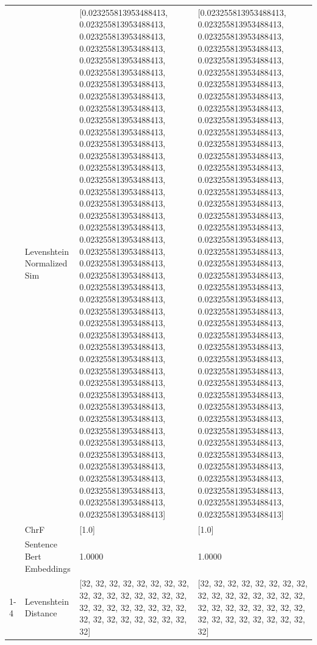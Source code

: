 \begin{tabular}{llll}
 & Levenshtein Normalized Sim & [0.023255813953488413, 0.023255813953488413, 0.023255813953488413, 0.023255813953488413, 0.023255813953488413, 0.023255813953488413, 0.023255813953488413, 0.023255813953488413, 0.023255813953488413, 0.023255813953488413, 0.023255813953488413, 0.023255813953488413, 0.023255813953488413, 0.023255813953488413, 0.023255813953488413, 0.023255813953488413, 0.023255813953488413, 0.023255813953488413, 0.023255813953488413, 0.023255813953488413, 0.023255813953488413, 0.023255813953488413, 0.023255813953488413, 0.023255813953488413, 0.023255813953488413, 0.023255813953488413, 0.023255813953488413, 0.023255813953488413, 0.023255813953488413, 0.023255813953488413, 0.023255813953488413, 0.023255813953488413, 0.023255813953488413, 0.023255813953488413, 0.023255813953488413, 0.023255813953488413, 0.023255813953488413, 0.023255813953488413, 0.023255813953488413, 0.023255813953488413, 0.023255813953488413, 0.023255813953488413, 0.023255813953488413] & [0.023255813953488413, 0.023255813953488413, 0.023255813953488413, 0.023255813953488413, 0.023255813953488413, 0.023255813953488413, 0.023255813953488413, 0.023255813953488413, 0.023255813953488413, 0.023255813953488413, 0.023255813953488413, 0.023255813953488413, 0.023255813953488413, 0.023255813953488413, 0.023255813953488413, 0.023255813953488413, 0.023255813953488413, 0.023255813953488413, 0.023255813953488413, 0.023255813953488413, 0.023255813953488413, 0.023255813953488413, 0.023255813953488413, 0.023255813953488413, 0.023255813953488413, 0.023255813953488413, 0.023255813953488413, 0.023255813953488413, 0.023255813953488413, 0.023255813953488413, 0.023255813953488413, 0.023255813953488413, 0.023255813953488413, 0.023255813953488413, 0.023255813953488413, 0.023255813953488413, 0.023255813953488413, 0.023255813953488413, 0.023255813953488413, 0.023255813953488413, 0.023255813953488413, 0.023255813953488413, 0.023255813953488413] \\
 & ChrF & [1.0] & [1.0] \\
 & Sentence Bert Embeddings & 1.0000 & 1.0000 \\
\cline{1-4}
\multirow[t]{4}{*}{Obore nigo bore oboigoro k'ogose kera.} & Levenshtein Distance & [32, 32, 32, 32, 32, 32, 32, 32, 32, 32, 32, 32, 32, 32, 32, 32, 32, 32, 32, 32, 32, 32, 32, 32, 32, 32, 32, 32, 32, 32, 32, 32, 32] & [32, 32, 32, 32, 32, 32, 32, 32, 32, 32, 32, 32, 32, 32, 32, 32, 32, 32, 32, 32, 32, 32, 32, 32, 32, 32, 32, 32, 32, 32, 32, 32, 32] \\

\end{tabular}

